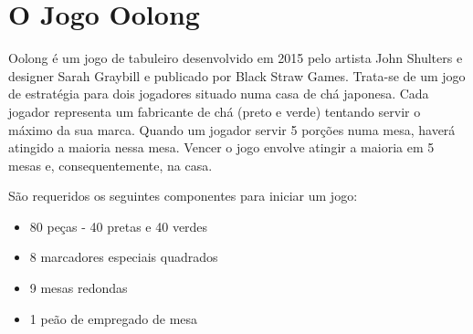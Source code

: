 \documentclass[a4paper]{article}
\begin{document}

\newpage

%
%
%
%
%
%
%


\section{O Jogo Oolong}

Oolong é um jogo de tabuleiro desenvolvido em 2015 pelo artista John Shulters e designer Sarah Graybill e publicado por Black Straw Games.
Trata-se de um jogo de estratégia para dois jogadores situado numa casa de chá japonesa. Cada jogador representa um fabricante de chá (preto e verde) tentando servir o máximo da sua marca. Quando um jogador servir 5 porções numa mesa, haverá atingido a maioria nessa mesa. Vencer o jogo envolve atingir a maioria em 5 mesas e, consequentemente, na casa.

São requeridos os seguintes componentes para iniciar um jogo:
\begin{itemize}
\item 80 peças - 40 pretas e 40 verdes
\item 8 marcadores especiais quadrados
\item 9 mesas redondas
\item 1 peão de empregado de mesa
\end{itemize}
\end{document}
